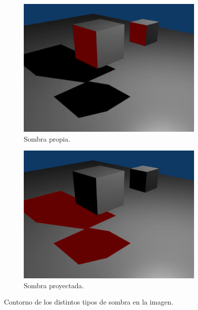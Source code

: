 \documentclass{article}
\begin{document}
\begin{figure}[H]
    \centering 
	\begin{subfigure}[H]{0.48\textwidth}
	    \centering
        \includegraphics[width=\textwidth]{imagenes/sombra0004propia.png}
        \caption{Sombra propia.}
    \end{subfigure}
    \hfill
	\begin{subfigure}[H]{0.48\textwidth}
	    \centering
        \includegraphics[width=\textwidth]{imagenes/sombra0004proy.png}
        \caption{Sombra proyectada.}
    \end{subfigure}    
    \caption{Contorno de los distintos tipos de sombra en la imagen.}
\end{figure}
\end{document}
